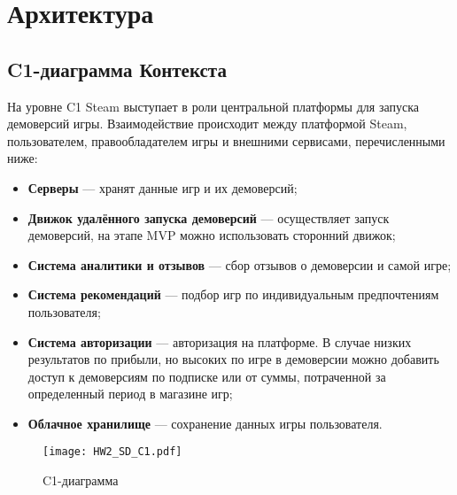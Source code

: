 \documentclass[12pt, a4paper]{article}
\begin{document}
\section{Архитектура}

\subsection{C1-диаграмма Контекста}
На уровне C1 Steam выступает в роли центральной платформы для запуска демоверсий игры. Взаимодействие происходит между платформой Steam, пользователем, правообладателем игры и внешними сервисами, перечисленными ниже:
\begin{itemize}
    \item \textbf{Серверы} — хранят данные игр и их демоверсий;
    \item \textbf{Движок удалённого запуска демоверсий} — осуществляет запуск демоверсий, на этапе MVP можно использовать сторонний движок;
    \item \textbf{Система аналитики и отзывов} — сбор отзывов о демоверсии и самой игре;
    \item \textbf{Система рекомендаций} — подбор игр по индивидуальным предпочтениям пользователя;
    \item \textbf{Система авторизации} — авторизация на платформе. В случае низких результатов по прибыли, но высоких по игре в демоверсии можно добавить доступ к демоверсиям по подписке или от суммы, потраченной за определенный период в магазине игр;
    \item \textbf{Облачное хранилище} — сохранение данных игры пользователя.
\end{itemize}


\begin{figure}[htbp]
    \centering
    \texttt{[image: HW2\_SD\_C1.pdf]}
    \caption{C1-диаграмма}
    \label{fig:C1}
\end{figure}

\newpage
\end{document}
